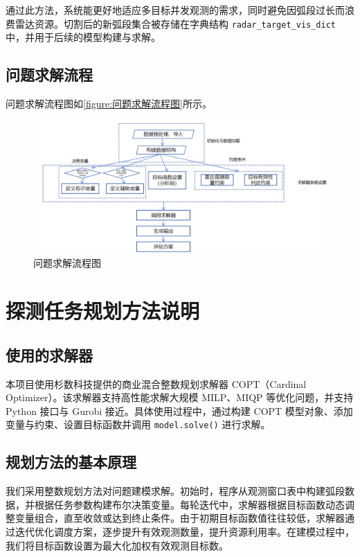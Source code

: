 \documentclass[openany,12pt,UTF8]{ctexart}
\begin{document}
通过此方法，系统能更好地适应多目标并发观测的需求，同时避免因弧段过长而浪费雷达资源。切割后的新弧段集合被存储在字典结构 \texttt{radar\_target\_vis\_dict} 中，并用于后续的模型构建与求解。

\subsection{问题求解流程}
问题求解流程图如\autoref{figure:问题求解流程图}所示。
\begin{figure}[h]\centering
    \includegraphics[width=\columnwidth]{figures/问题求解流程图.png}
    \caption{问题求解流程图}
    \label{figure:问题求解流程图}
\end{figure}

\section{探测任务规划方法说明}
\subsection{使用的求解器}
本项目使用杉数科技提供的商业混合整数规划求解器 COPT（Cardinal Optimizer）。该求解器支持高性能求解大规模 MILP、MIQP 等优化问题，并支持 Python 接口与 Gurobi 接近。具体使用过程中，通过构建 COPT 模型对象、添加变量与约束、设置目标函数并调用 \texttt{model.solve()} 进行求解。

\subsection{规划方法的基本原理}
我们采用整数规划方法对问题建模求解。初始时，程序从观测窗口表中构建弧段数据，并根据任务参数构建布尔决策变量。每轮迭代中，求解器根据目标函数动态调整变量组合，直至收敛或达到终止条件。由于初期目标函数值往往较低，求解器通过迭代优化调度方案，逐步提升有效观测数量，提升资源利用率。在建模过程中，我们将目标函数设置为最大化加权有效观测目标数。
\end{document}
